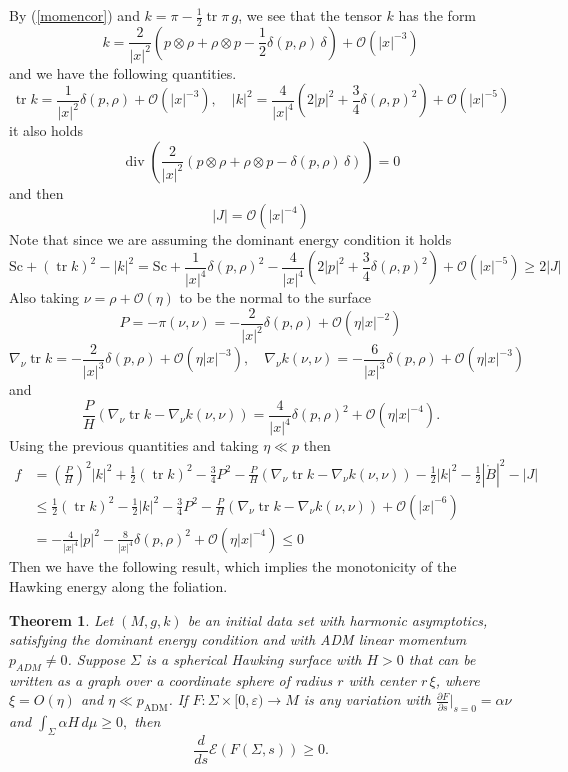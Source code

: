 \documentclass[12pt,a4paper]{amsart}
\theoremstyle{plain}
\newtheorem{theorem}{Theorem}[section]
\theoremstyle{definition}
\newcommand{\diver}{\operatorname{div}}
\newcommand{\tr}{\operatorname{tr}}
\begin{document}
By (\ref{momencor}) and $ k= \pi - \frac{1}{2} \tr \pi \,g$, we see that the tensor $k$  has the form
\[
k = \frac{2}{|x|^2} (p \otimes \rho + \rho \otimes p -\frac{1}{2} \delta( p, \rho )\, \delta) + \mathcal{O} ( |x|^{-3}) 
\]
and we have the following quantities.
$$ \tr k = \frac{1}{|x|^2} \delta( p, \rho ) +\mathcal{O} (|x|^{-3}), \quad |k|^2 = \frac{4}{|x|^4} (2|p|^2 + \frac{3}{4} \delta( \rho, p )^2 ) +\mathcal{O} (|x|^{-5})$$
it also holds
$$\diver (\frac{2}{|x|^2} (p \otimes \rho + \rho \otimes p - \delta( p, \rho )\, \delta)) =0 $$
  and then 
$$|J|= \mathcal{O} (|x|^{-4}) $$
Note that since we are assuming  the dominant energy condition it holds  
$$\mathrm{Sc} + (\tr k)^2 - |k|^2= \mathrm{Sc} +\frac{1}{|x|^4}\delta( p,\rho )^2 - \frac{4}{|x|^4} (2|p|^2 + \frac{3}{4} \delta( \rho, p )^2 ) + \mathcal{O} ( |x|^{-5}) \geq 2 |J| $$
 Also taking $\nu= \rho +\mathcal{O}(\eta)$ to be the normal to the surface 
$$P=-\pi(\nu, \nu)=-\frac{2}{|x|^2} \delta( p, \rho ) +\mathcal{O} (\eta |x|^{-2})  $$
$$ \nabla_\nu \tr k = -\frac{2}{|x|^3} \delta( p, \rho ) + \mathcal{O} (\eta |x|^{-3}),\quad \nabla_\nu k(\nu, \nu)= -\frac{6}{|x|^3} \delta( p, \rho ) + \mathcal{O} ( \eta|x|^{-3}) $$
and 
$$\frac{P}{H}( \nabla_\nu \tr k - \nabla_\nu k(\nu,\nu )) = \frac{4}{|x|^4} \delta( p, \rho )^2 +  \mathcal{O} ( \eta |x|^{-4 }) .$$
Using the previous quantities and  taking $\eta \ll p$ then
\begin{equation}\label{monpiece}
\begin{split}
        f&=\left( \frac{P}{H}\right)^2|k|^2+ \frac{1}{2 }(\tr k)^2    - \frac{3}{4} P^2- \frac{P}{H}( \nabla_\nu \tr k - \nabla_\nu k(\nu,\nu )) -  \frac{1}{2} |k|^2  -\frac{1}{2} |\mathring{B}|^2 -|J| \\
        &\leq  \frac{1}{2 }(\tr k)^2 -  \frac{1}{2} |k|^2    - \frac{3}{4} P^2- \frac{P}{H}( \nabla_\nu \tr k - \nabla_\nu k(\nu,\nu )) +\mathcal{O} ( |x|^{-6})\\  
        &=   -\frac{4}{|x|^4}|p|^2 -\frac{8}{|x|^4}  \delta( p, \rho )^2 +\mathcal{O} (\eta |x|^{-4}) \leq 0    
\end{split}
\end{equation}
Then we have the following result, which implies the monotonicity of the Hawking energy along the foliation.
\begin{theorem}\label{monocosho}
    Let $(M,g,k)$ be an initial data set with harmonic  asymptotics, satisfying the dominant energy condition and with ADM linear momentum $p_{ADM} \neq 0$. Suppose \(\Sigma\) is a spherical Hawking surface with \(H>0\) that can be written as a graph over a coordinate sphere of radius \(r\) with center \(r\,\xi\), where \(\xi=O(\eta)\) and \(\eta\ll p_{\mathrm{ADM}}\). If \( F : \Sigma \times [0, \varepsilon) \rightarrow M \) is any variation with \( \frac{\partial F}{\partial s} \Big|_{s=0} = \alpha \nu \) and $\int_{\Sigma} \alpha H \, d\mu \geq 0,$ then 
\[
\frac{d}{ds} \mathcal{E}(F(\Sigma, s)) \geq 0.
\]
\end{theorem}
\end{document}
